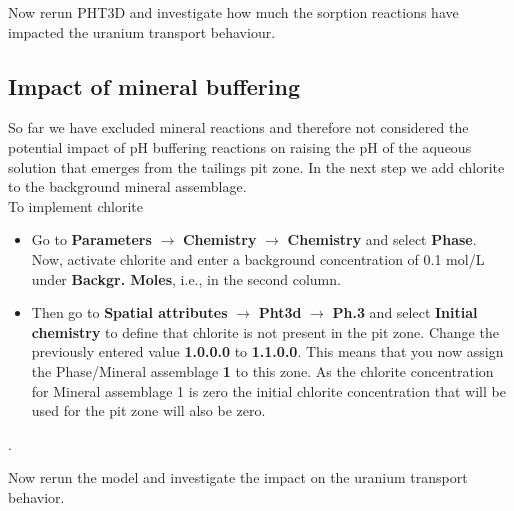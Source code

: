 Now rerun PHT3D and investigate how much the sorption reactions have impacted 
the uranium transport behaviour.   

\subsection{Impact of mineral buffering}

So far we have excluded mineral reactions and therefore not considered 
the potential impact of pH buffering reactions on 
raising the pH of the aqueous solution that emerges from the 
tailings pit zone. In the next step we add chlorite to the 
background mineral assemblage. 
\\
To implement chlorite
\begin{itemize}
\item Go to 
{\color{blue}\textbf{Parameters}}
$\rightarrow$ {\color{blue}\textbf{Chemistry}} 
$\rightarrow$ {\color{blue}\textbf{Chemistry}}
and select {\color{blue}\textbf{Phase}}.
Now, activate chlorite and enter a background concentration
of 0.1 mol/L under {\color{blue}\textbf{Backgr. Moles}}, i.e., 
in the second column.
\item Then go to 
{\color{blue}\textbf{Spatial attributes}} 
$\rightarrow$ {\color{blue}\textbf{Pht3d}}
$\rightarrow$ {\color{blue}\textbf{Ph.3}}
and select {\color{blue}\textbf{Initial chemistry}} 
to define that chlorite is not present in the pit zone.
Change the previously entered value 
{\color{blue}\textbf{1.0.0.0}} to {\color{blue}\textbf{1.1.0.0}}.
This means that you now assign 
the Phase/Mineral assemblage {\color{blue}\textbf{1}}
to this zone. As the chlorite concentration for Mineral assemblage 1 is zero
the initial chlorite concentration that will be used for the pit zone
will also be zero.
\end{itemize}.

Now rerun the model and investigate the impact on the uranium transport behavior.


 
  




